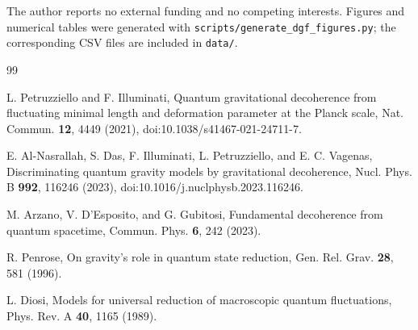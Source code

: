 \documentclass[aps,prl,twocolumn,superscriptaddress,nofootinbib,floatfix]{revtex4-2}
\begin{document}
\begin{acknowledgments}
The author reports no external funding and no competing interests. Figures and numerical tables were generated with \texttt{scripts/generate\_dgf\_figures.py}; the corresponding CSV files are included in \texttt{data/}.
\end{acknowledgments}

\begin{thebibliography}{99}

L. Petruzziello and F. Illuminati,
Quantum gravitational decoherence from fluctuating minimal length and deformation parameter at the Planck scale,
Nat. Commun. \textbf{12}, 4449 (2021),
doi:10.1038/s41467-021-24711-7.

E. Al-Nasrallah, S. Das, F. Illuminati, L. Petruzziello, and E. C. Vagenas,
Discriminating quantum gravity models by gravitational decoherence,
Nucl. Phys. B \textbf{992}, 116246 (2023),
doi:10.1016/j.nuclphysb.2023.116246.

M. Arzano, V. D'Esposito, and G. Gubitosi,
Fundamental decoherence from quantum spacetime,
Commun. Phys. \textbf{6}, 242 (2023).

R. Penrose,
On gravity's role in quantum state reduction,
Gen. Rel. Grav. \textbf{28}, 581 (1996).

L. Diosi,
Models for universal reduction of macroscopic quantum fluctuations,
Phys. Rev. A \textbf{40}, 1165 (1989).

\end{thebibliography}
\end{document}
